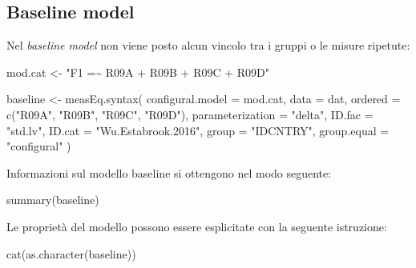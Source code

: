 \documentclass[
  11pt,
]{krantz}
\makeatletter
\newenvironment{Shaded}{\begin{snugshade}}{\end{snugshade}}
\newcommand{\AttributeTok}[1]{\textcolor[rgb]{0.61,0.61,0.61}{#1}}
\newcommand{\FunctionTok}[1]{\textcolor[rgb]{0,0,0}{#1}}
\newcommand{\NormalTok}[1]{#1}
\newcommand{\OtherTok}[1]{\textcolor[rgb]{0.37,0.37,0.37}{#1}}
\newcommand{\StringTok}[1]{\textcolor[rgb]{0.5,0.5,0.5}{#1}}
\newenvironment{kframe}{%
\medskip{}
\setlength{\fboxsep}{.8em}
 \def\at@end@of@kframe{}%
 \ifinner\ifhmode%
  \def\at@end@of@kframe{\end{minipage}}%
  \begin{minipage}{\columnwidth}%
 \fi\fi%
 \def\FrameCommand##1{\hskip\@totalleftmargin \hskip-\fboxsep
 \colorbox{shadecolor}{##1}\hskip-\fboxsep
     \hskip-\linewidth \hskip-\@totalleftmargin \hskip\columnwidth}%
 \MakeFramed {\advance\hsize-\width
   \@totalleftmargin\z@ \linewidth\hsize
   \@setminipage}}%
 {\par\unskip\endMakeFramed%
 \at@end@of@kframe}
\renewenvironment{Shaded}{\begin{kframe}}{\end{kframe}}
\theoremstyle{definition}
\theoremstyle{definition}
\theoremstyle{definition}
\theoremstyle{definition}
\theoremstyle{remark}
\makeatother
\begin{document}
\hypertarget{baseline-model}{%
\subsection{Baseline model}\label{baseline-model}}

Nel \emph{baseline model} non viene posto alcun vincolo tra i gruppi o le misure ripetute:

\begin{Shaded}
\begin{Highlighting}[]
\NormalTok{mod.cat }\OtherTok{\textless{}{-}} \StringTok{"F1 =\textasciitilde{} R09A + R09B + R09C + R09D"}
\end{Highlighting}
\end{Shaded}

\begin{Shaded}
\begin{Highlighting}[]
\NormalTok{baseline }\OtherTok{\textless{}{-}} \FunctionTok{measEq.syntax}\NormalTok{(}
  \AttributeTok{configural.model =}\NormalTok{ mod.cat,}
  \AttributeTok{data =}\NormalTok{ dat,}
  \AttributeTok{ordered =} \FunctionTok{c}\NormalTok{(}\StringTok{"R09A"}\NormalTok{, }\StringTok{"R09B"}\NormalTok{, }\StringTok{"R09C"}\NormalTok{, }\StringTok{"R09D"}\NormalTok{),}
  \AttributeTok{parameterization =} \StringTok{"delta"}\NormalTok{,}
  \AttributeTok{ID.fac =} \StringTok{"std.lv"}\NormalTok{,}
  \AttributeTok{ID.cat =} \StringTok{"Wu.Estabrook.2016"}\NormalTok{,}
  \AttributeTok{group =} \StringTok{"IDCNTRY"}\NormalTok{,}
  \AttributeTok{group.equal =} \StringTok{"configural"}
\NormalTok{)}
\end{Highlighting}
\end{Shaded}

Informazioni sul modello baseline si ottengono nel modo seguente:

\begin{Shaded}
\begin{Highlighting}[]
\FunctionTok{summary}\NormalTok{(baseline)}
\end{Highlighting}
\end{Shaded}

Le proprietà del modello possono essere esplicitate con la seguente istruzione:

\begin{Shaded}
\begin{Highlighting}[]
\FunctionTok{cat}\NormalTok{(}\FunctionTok{as.character}\NormalTok{(baseline))}
\end{Highlighting}
\end{Shaded}
\end{document}
